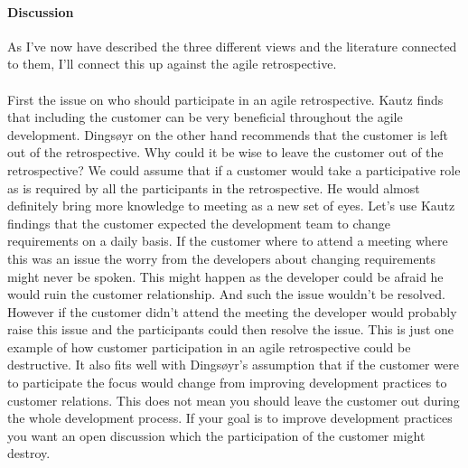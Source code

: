 \documentclass[12pt]{article}
\begin{document}
\paragraph{Discussion}
As I've now have described the three different views and the literature connected to them, I'll connect this up against the agile retrospective. 
\\\\
First the issue on who should participate in an agile retrospective. Kautz finds that including the customer can be very beneficial throughout the agile development. Dingsøyr on the other hand recommends that the customer is left out of the retrospective. Why could it be wise to leave the customer out of the retrospective? We could assume that if a customer would take a participative role as is required by all the participants in the retrospective. He would almost definitely bring more knowledge to meeting as a new set of eyes. Let's use Kautz findings that the customer expected the development team to change requirements on a daily basis. If the customer where to attend a meeting where this was an issue the worry from the developers about changing requirements might never be spoken. This might happen as the developer could be afraid he would ruin the customer relationship. And such the issue wouldn't be resolved. However if the customer didn't attend the meeting the developer would probably raise this issue and the participants could then resolve the issue. This is just one example of how customer participation in an agile retrospective could be destructive. It also fits well with Dingsøyr's assumption that if the customer were to participate the focus would change from improving development practices to customer relations. This does not mean you should leave the customer out during the whole development process. If your goal is to improve development practices you want an open discussion which the participation of the customer might destroy.
\\\\
\end{document}
